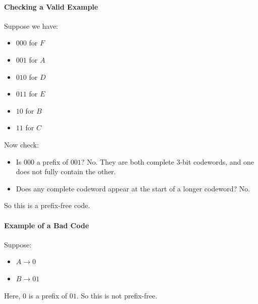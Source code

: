 \documentclass[11pt,a4paper]{book}
\begin{document}
\paragraph{Checking a Valid Example}
Suppose we have:
\begin{itemize}
    \item \(000\) for \(F\)
    \item \(001\) for \(A\)
    \item \(010\) for \(D\)
    \item \(011\) for \(E\)
    \item \(10\) for \(B\)
    \item \(11\) for \(C\)
\end{itemize}

Now check:
\begin{itemize}
    \item Is \(000\) a prefix of \(001\)? No. They are both complete 3-bit codewords, and one does not fully contain the other.
    \item Does any complete codeword appear at the start of a longer codeword? No.
\end{itemize}

So this is a prefix-free code.

\paragraph{Example of a Bad Code}
Suppose:
\begin{itemize}
    \item \(A \to 0\)
    \item \(B \to 01\)
\end{itemize}

Here, \(0\) is a prefix of \(01\). So this is not prefix-free.
\end{document}
